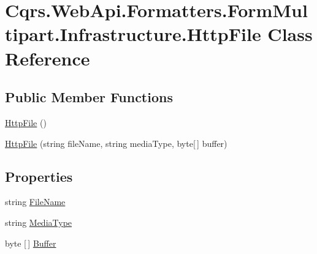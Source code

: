 \hypertarget{classCqrs_1_1WebApi_1_1Formatters_1_1FormMultipart_1_1Infrastructure_1_1HttpFile}{}\section{Cqrs.\+Web\+Api.\+Formatters.\+Form\+Multipart.\+Infrastructure.\+Http\+File Class Reference}
\label{classCqrs_1_1WebApi_1_1Formatters_1_1FormMultipart_1_1Infrastructure_1_1HttpFile}
\subsection*{Public Member Functions}
\begin{DoxyCompactItemize}
\item 
\hyperlink{classCqrs_1_1WebApi_1_1Formatters_1_1FormMultipart_1_1Infrastructure_1_1HttpFile_a27c8a6f375de51c5d5ff6d3602ab23c2_a27c8a6f375de51c5d5ff6d3602ab23c2}{Http\+File} ()
\item 
\hyperlink{classCqrs_1_1WebApi_1_1Formatters_1_1FormMultipart_1_1Infrastructure_1_1HttpFile_a725fbc81d5a60e8a85f4cf789907b934_a725fbc81d5a60e8a85f4cf789907b934}{Http\+File} (string file\+Name, string media\+Type, byte\mbox{[}$\,$\mbox{]} buffer)
\end{DoxyCompactItemize}
\subsection*{Properties}
\begin{DoxyCompactItemize}
\item 
string \hyperlink{classCqrs_1_1WebApi_1_1Formatters_1_1FormMultipart_1_1Infrastructure_1_1HttpFile_a2cc7c6095e350040250f4f7160b05441_a2cc7c6095e350040250f4f7160b05441}{File\+Name}
\item 
string \hyperlink{classCqrs_1_1WebApi_1_1Formatters_1_1FormMultipart_1_1Infrastructure_1_1HttpFile_a46f04eac1b1e5c8882622548912c481b_a46f04eac1b1e5c8882622548912c481b}{Media\+Type}
\item 
byte \mbox{[}$\,$\mbox{]} \hyperlink{classCqrs_1_1WebApi_1_1Formatters_1_1FormMultipart_1_1Infrastructure_1_1HttpFile_a225694e4e77da8307f6c22d9cb33fbb0_a225694e4e77da8307f6c22d9cb33fbb0}{Buffer}
\end{DoxyCompactItemize}


